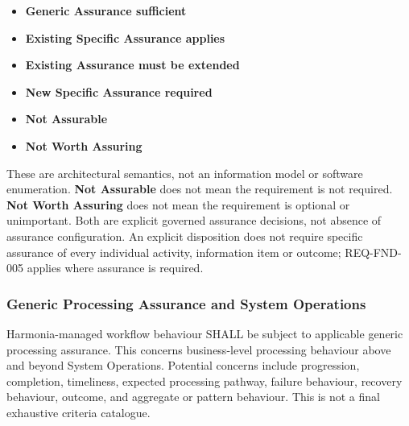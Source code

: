 \begin{itemize}

\item
\textbf{Generic Assurance sufficient}



\item
\textbf{Existing Specific Assurance applies}



\item
\textbf{Existing Assurance must be extended}



\item
\textbf{New Specific Assurance required}



\item
\textbf{Not Assurable}



\item
\textbf{Not Worth Assuring}



\end{itemize}
\label{rad:enabling:714}

These are architectural semantics, not an information model or software enumeration. \textbf{Not Assurable} does not mean the requirement is not required. \textbf{Not Worth Assuring} does not mean the requirement is optional or unimportant. Both are explicit governed assurance decisions, not absence of assurance configuration. An explicit disposition does not require specific assurance of every individual activity, information item or outcome; REQ-FND-005 applies where assurance is required.

\label{rad:enabling:716}
\subsubsection*{Generic Processing Assurance and System Operations}
\label{rad:enabling:718}

Harmonia-managed workflow behaviour SHALL be subject to applicable generic processing assurance. This concerns business-level processing behaviour above and beyond System Operations. Potential concerns include progression, completion, timeliness, expected processing pathway, failure behaviour, recovery behaviour, outcome, and aggregate or pattern behaviour. This is not a final exhaustive criteria catalogue.

\label{rad:enabling:720}


